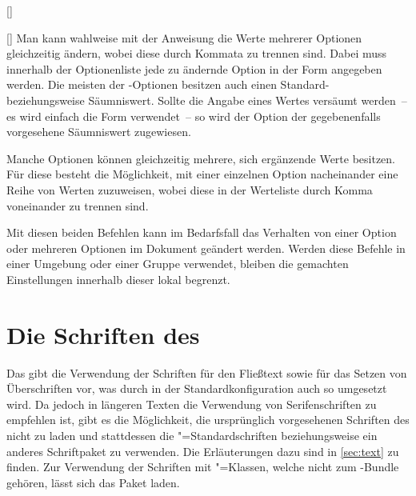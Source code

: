 \begin{Declaration*}{}
\begin{Declaration*}{}
\begin{Declaration*}{}
\begin{Declaration}{[]}
\begin{Declaration}{[]}
Man kann wahlweise mit der Anweisung  die Werte mehrerer 
Optionen gleichzeitig ändern, wobei diese durch Kommata zu trennen sind. Dabei 
muss innerhalb der Optionenliste jede zu ändernde Option in der Form 
\PValue{=} angegeben werden. Die meisten der 
\TUDScript-Optionen besitzen auch einen Standard- beziehungsweise Säumniswert. 
Sollte die Angabe eines Wertes versäumt werden~-- es wird einfach die Form 
 verwendet~-- so wird der Option der gegebenenfalls vorgesehene 
Säumniswert zugewiesen.

Manche Optionen können gleichzeitig mehrere, sich ergänzende Werte besitzen. 
Für diese besteht die Möglichkeit, mit  einer einzelnen Option 
nacheinander eine Reihe von Werten zuzuweisen, wobei diese in der Werteliste 
durch Komma voneinander zu trennen sind.

Mit diesen beiden Befehlen kann im Bedarfsfall das Verhalten von einer Option 
oder mehreren Optionen im Dokument geändert werden. Werden diese Befehle in 
einer Umgebung oder einer Gruppe verwendet, bleiben die gemachten Einstellungen 
innerhalb dieser lokal begrenzt.
\end{Declaration}
\end{Declaration}



\section{Die Schriften des \CDs}
%
%
%
%
Das \TUDCD gibt die Verwendung der Schriften \Univers für den Fließtext 
sowie \DIN für das Setzen von Überschriften vor, was durch \TUDScript in der 
Standardkonfiguration auch so umgesetzt wird. Da jedoch in längeren Texten die 
Verwendung von Serifenschriften zu empfehlen ist, gibt es die Möglichkeit, die 
ursprünglich vorgesehenen Schriften des \CDs nicht zu laden und stattdessen die 
"=Standardschriften beziehungsweise ein anderes Schriftpaket zu 
verwenden. Die Erläuterungen dazu sind in \autoref{sec:text} zu finden. Zur 
Verwendung der Schriften mit "=Klassen, welche nicht zum 
\TUDScript-Bundle gehören, lässt sich das Paket  laden.


\end{Declaration*}
\end{Declaration*}
\end{Declaration*}
